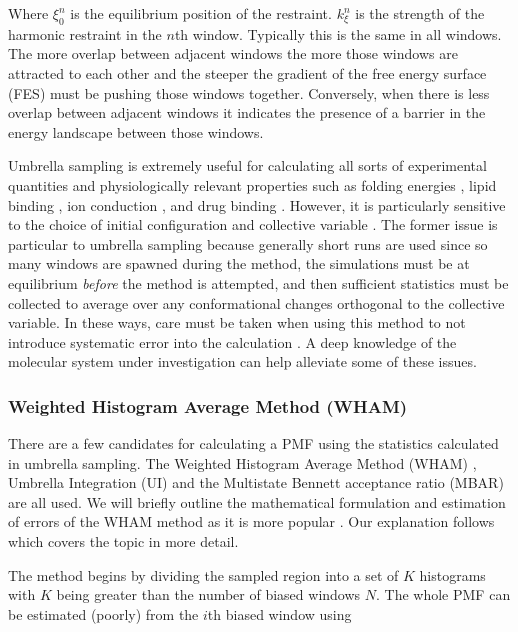 Where $\xi_0^n$ is the equilibrium position of the restraint. $k_{\xi}^n$ is the strength of the harmonic restraint in the $n$th window. Typically this is the same in all windows. The more overlap between adjacent windows the more those windows are attracted to each other and the steeper the gradient of the free energy surface (FES) must be pushing those windows together. Conversely, when there is less overlap between adjacent windows it indicates the presence of a barrier in the energy landscape between those windows.

Umbrella sampling is extremely useful for calculating all sorts of experimental quantities and physiologically relevant properties such as folding energies \cite{meshkin2017}, lipid binding \cite{domanski2017}, ion conduction \cite{zhu2012}, and drug binding \cite{subramanian2019}. However, it is particularly sensitive to the choice of initial configuration and collective variable \cite{domanski2017}. The former issue is particular to umbrella sampling because generally short runs are used since so many windows are spawned during the method, the simulations must be at equilibrium \textit{before} the method is attempted, and then sufficient statistics must be collected to average over any conformational changes orthogonal to the collective variable. In these ways, care must be taken when using this method to not introduce systematic error into the calculation \cite{you2019}. A deep knowledge of the molecular system under investigation can help alleviate some of these issues. 

\subsubsection{Weighted Histogram Average Method (WHAM)}
There are a few candidates for calculating a PMF using the statistics calculated in umbrella sampling. The Weighted Histogram Average Method (WHAM) \cite{kumar1992}, Umbrella Integration (UI) \cite{kastner2005} and the Multistate Bennett acceptance ratio (MBAR) \cite{kim2012} are all used. We will briefly outline the mathematical formulation and estimation of errors of the WHAM method as it is more popular \cite{zhu2012}. Our explanation follows \cite{kastner2011} which covers the topic in more detail.

The method begins by dividing the sampled region into a set of $K$ histograms with $K$ being greater than the number of biased windows $N$.  The whole PMF can be estimated (poorly) from the $i$th biased window using 

